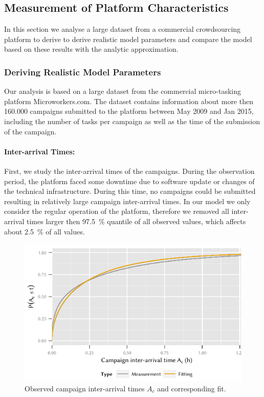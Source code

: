\subsection{Measurement of Platform Characteristics}\label{sec:cloud:crowdsourcing:measurements}
In this section we analyse a large dataset from a commercial crowdsourcing platform to derive to derive realistic model parameters and compare the model based on these results with the analytic approximation.

\subsubsection*{Deriving Realistic Model Parameters}
Our analysis is based on a large dataset from the commercial micro-tasking platform Microworkers.com.
The dataset contains information about more then 160.000 campaigns submitted to the platform between May 2009 and Jan 2015, including the number of tasks per campaign as well as the time of the submission of the campaign.

\paragraph*{Inter-arrival Times:} First, we study the inter-arrival times of the campaigns.
During the observation period, the platform faced some downtime due to software update or changes of the technical infrastructure.
During this time, no campaigns could be submitted resulting in relatively large campaign inter-arrival times.
In our model we only consider the regular operation of the platform, therefore we removed all inter-arrival times larger then \SI{97.5}{\percent} quantile of all observed values, which affects about \SI{2.5}{\percent} of all values.

\begin{figure}
  \centering
  \includegraphics{cloud/crowdsourcing/measurements/figures/campaign_interarrival}
  \caption{Observed campaign inter-arrival times \(A_c\) and corresponding fit.}
  \label{fig:cloud:crowdsourcing:measurements:parameters:campaign_interarrival}
\end{figure}

